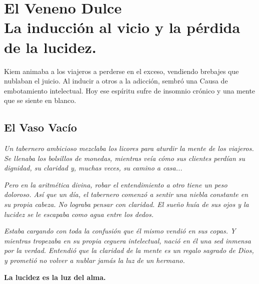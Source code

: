 \chapter[El Veneno Dulce]{El Veneno Dulce\\ \large La inducción al vicio y la pérdida de la lucidez.}


\lettrine[lines=3, nindent=0.5em, findent=0.2em]{K}{}iem animaba a los viajeros a perderse en el exceso, vendiendo brebajes que nublaban el juicio. Al inducir a otros a la adicción, sembró una Causa de embotamiento intelectual. Hoy ese espíritu sufre de insomnio crónico y una mente que se siente en blanco.

\section{El Vaso Vacío}
\begin{elegantquote}
\textit{Un tabernero ambicioso mezclaba los licores para aturdir la mente de los viajeros. Se llenaba los bolsillos de monedas, mientras veía cómo sus clientes perdían su dignidad, su claridad y, muchas veces, su camino a casa...}

\textit{Pero en la aritmética divina, robar el entendimiento a otro tiene un peso doloroso. Así que un día, el tabernero comenzó a sentir una niebla constante en su propia cabeza. No lograba pensar con claridad. El sueño huía de sus ojos y la lucidez se le escapaba como agua entre los dedos.}

\textit{Estaba cargando con toda la confusión que él mismo vendió en sus copas. Y mientras tropezaba en su propia ceguera intelectual, nació en él una sed inmensa por la verdad. Entendió que la claridad de la mente es un regalo sagrado de Dios, y prometió no volver a nublar jamás la luz de un hermano.}

\end{elegantquote}

\vspace{1em}
\begin{center}
    \textbf{\Large La lucidez es la luz del alma.}
\end{center}
\vspace{1em}

